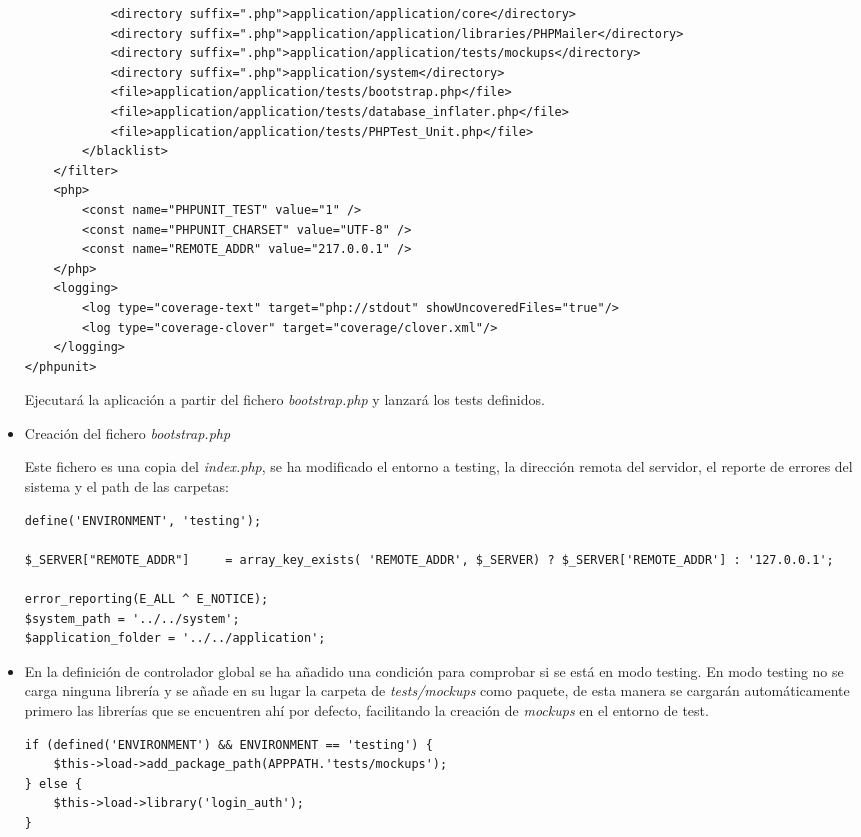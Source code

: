\begin{itemize}
\begin{lstlisting}
            <directory suffix=".php">application/application/core</directory>
            <directory suffix=".php">application/application/libraries/PHPMailer</directory>
            <directory suffix=".php">application/application/tests/mockups</directory>
            <directory suffix=".php">application/system</directory>
            <file>application/application/tests/bootstrap.php</file>
            <file>application/application/tests/database_inflater.php</file>
            <file>application/application/tests/PHPTest_Unit.php</file>
        </blacklist>
    </filter>
    <php>
        <const name="PHPUNIT_TEST" value="1" />
        <const name="PHPUNIT_CHARSET" value="UTF-8" />
        <const name="REMOTE_ADDR" value="217.0.0.1" />
    </php>
    <logging>
        <log type="coverage-text" target="php://stdout" showUncoveredFiles="true"/>
        <log type="coverage-clover" target="coverage/clover.xml"/>
    </logging>
</phpunit>
                \end{lstlisting}

        Ejecutará la aplicación a partir del fichero \emph{bootstrap.php} y lanzará los tests definidos.

    \item Creación del fichero \emph{bootstrap.php}

        Este fichero es una copia del \emph{index.php}, se ha modificado el entorno a testing, la dirección remota del servidor, el reporte de errores del sistema y el path de las carpetas:
                \begin{lstlisting}
define('ENVIRONMENT', 'testing');

$_SERVER["REMOTE_ADDR"]     = array_key_exists( 'REMOTE_ADDR', $_SERVER) ? $_SERVER['REMOTE_ADDR'] : '127.0.0.1';

error_reporting(E_ALL ^ E_NOTICE);
$system_path = '../../system';
$application_folder = '../../application';
                \end{lstlisting}

    \item En la definición de controlador global se ha añadido una condición para comprobar si se está en modo testing. En modo testing no se carga ninguna librería y se añade en su lugar la carpeta de \emph{tests/mockups} como paquete, de esta manera se cargarán automáticamente primero las librerías que se encuentren ahí por defecto, facilitando la creación de \emph{mockups} en el entorno de test.

                \begin{lstlisting}
if (defined('ENVIRONMENT') && ENVIRONMENT == 'testing') {
    $this->load->add_package_path(APPPATH.'tests/mockups');
} else {
    $this->load->library('login_auth');
}
                \end{lstlisting}
\end{itemize}